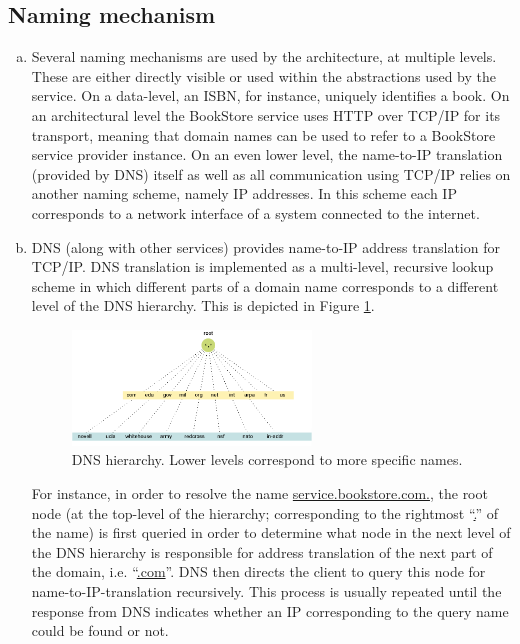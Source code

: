 \documentclass[11pt,a4paper,english]{article}
\begin{document}
\subsection{Naming mechanism}
\begin{enumerate}[(a)]
\item{Several naming mechanisms are used by the architecture, at multiple
    levels. These are either directly visible or used within the abstractions
    used by the service. On a data-level, an ISBN, for instance, uniquely
    identifies a book. On an architectural level the BookStore service uses HTTP
    over TCP/IP for its transport, meaning that domain names can be used to
    refer to a BookStore service provider instance. On an even lower level, the
    name-to-IP translation (provided by DNS) itself as well as all communication
    using TCP/IP relies on another naming scheme, namely IP addresses. In this scheme each IP corresponds to a network interface of a system connected to the internet.}

\item{DNS (along with other services) provides name-to-IP address translation
    for TCP/IP. DNS translation is implemented as a multi-level, recursive
    lookup scheme in which different parts of a domain name corresponds to a
    different level of the DNS hierarchy. This is depicted in Figure
    \ref{fig:dns}.

\begin{figure}[!hbt]
    \centering
    \includegraphics[width=0.6\textwidth]{img/dns.png}
    \caption{DNS hierarchy. Lower levels correspond to more specific names.}
    \label{fig:dns}
\end{figure}

For instance, in order to resolve the name \url{service.bookstore.com.}, the
root node (at the top-level of the hierarchy; corresponding to the rightmost
``\url{.}'' of the name) is first queried in order to determine what node in the
next level of the DNS hierarchy is responsible for address translation of the
next part of the domain, i.e. ``\url{.com}''. DNS then directs the client to
query this node for name-to-IP-translation recursively. This process is usually
repeated until the response from DNS indicates whether an IP corresponding to
the query name could be found or not.}
\end{enumerate}
\end{document}
